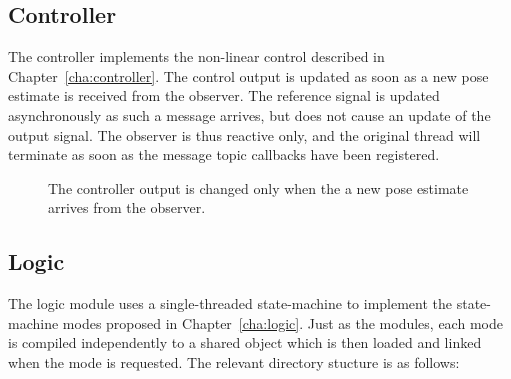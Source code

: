         \subsection{Controller}
            The controller implements the non-linear control described in Chapter~\ref{cha:controller}.
            The control output is updated as soon as a new pose estimate is
            received from the observer. The reference signal is updated asynchronously
            as such a message arrives, but does not cause an update of the output signal.
            The observer is thus reactive only, and the original
            thread will terminate as soon as the message topic callbacks have
            been registered.
            \begin{figure}[H]
                \noindent{}
                \caption{The controller output is changed only when the a new pose estimate arrives from the observer.}
                \label{fig:crap:controller}
            \end{figure}

        \subsection{Logic}
            The logic module uses a single-threaded state-machine to implement
            the state-machine modes proposed in Chapter~\ref{cha:logic}.
            Just as the modules, each mode is compiled independently to
            a shared object which is then loaded and linked when the mode
            is requested.
            The relevant directory stucture is as follows:

